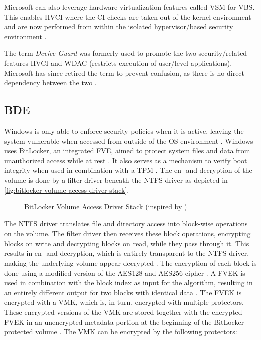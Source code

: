 Microsoft can also leverage hardware virtualization features called \ac{VSM} for \ac{VBS}.
This enables \ac{HVCI} where the \ac{CI} checks are taken out of the kernel environment and are now performed from within the isolated hypervisor\-/based security environment \cite{micosoft-windows-oem-vbs}.

The term \emph{Device Guard} was formerly used to promote the two security\-/related features \ac{HVCI} and \ac{WDAC} (restricts execution of user\-/level applications).
Microsoft has since retired the term to prevent confusion, as there is no direct dependency between the two \cite{microsoft-windows-no-longer-device-guard}.

\subsection{\acf{BDE}}
\label{sec:windows:security:bde}

Windows is only able to enforce security policies when it is active, leaving the system vulnerable when accessed from outside of the \ac{OS} environment \cite[Section 9]{windows-internals-6-part2}.
Windows uses BitLocker, an integrated \ac{FVE}, aimed to protect system files and data from unauthorized access while at rest \cite{microsoft-bitlocker-overview}.
It also serves as a mechanism to verify boot integrity when used in combination with a \ac{TPM} \cite[Section 9]{windows-internals-6-part2}.
The en- and decryption of the volume is done by a filter driver beneath the \ac{NTFS} driver as depicted in \autoref{fig:bitlocker-volume-access-driver-stack}.

\begin{figure}[htb]%
    \centering
    
    \caption[BitLocker Volume Access Driver Stack]{BitLocker Volume Access Driver Stack (inspired by \cite[Figure 9-24]{windows-internals-6-part2})}%
    \label{fig:bitlocker-volume-access-driver-stack}%
\end{figure}

The \ac{NTFS} driver translates file and directory access into block-wise operations on the volume.
The filter driver then receives these block operations, encrypting blocks on write and decrypting blocks on read, while they pass through it.
This results in en- and decryption, which is entirely transparent to the \ac{NTFS} driver, making the underlying volume appear decrypted \cite[Section 9]{windows-internals-6-part2}.
The encryption of each block is done using a modified version of the \ac{AES}128 and \ac{AES}256 cipher \cite[Section 9]{windows-internals-6-part2}.
A \ac{FVEK} is used in combination with the block index as input for the algorithm, resulting in an entirely different output for two blocks with identical data \cite[Section 9]{windows-internals-6-part2}.
The \ac{FVEK} is encrypted with a \ac{VMK}, which is, in turn, encrypted with multiple protectors.
These encrypted versions of the \ac{VMK} are stored together with the encrypted \ac{FVEK} in an unencrypted metadata portion at the beginning of the BitLocker protected volume \cite[Section 9]{windows-internals-6-part2}.
The \ac{VMK} can be encrypted by the following protectors:

